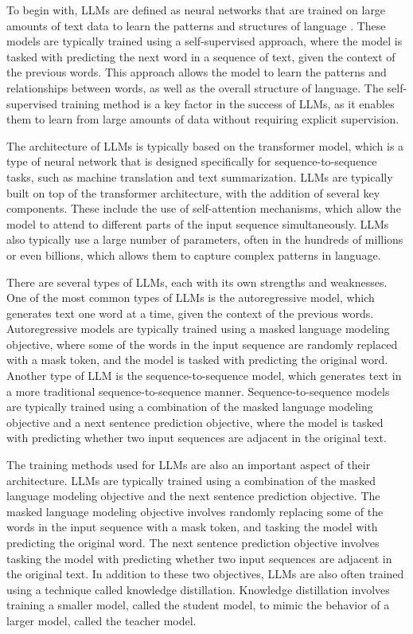 \documentclass[11pt]{article}
\begin{document}
To begin with, LLMs are defined as neural networks that are trained on large amounts of text data to learn the patterns and structures of language \cite{ref1}. These models are typically trained using a self-supervised approach, where the model is tasked with predicting the next word in a sequence of text, given the context of the previous words. This approach allows the model to learn the patterns and relationships between words, as well as the overall structure of language. The self-supervised training method is a key factor in the success of LLMs, as it enables them to learn from large amounts of data without requiring explicit supervision.

The architecture of LLMs is typically based on the transformer model, which is a type of neural network that is designed specifically for sequence-to-sequence tasks, such as machine translation and text summarization. LLMs are typically built on top of the transformer architecture, with the addition of several key components. These include the use of self-attention mechanisms, which allow the model to attend to different parts of the input sequence simultaneously. LLMs also typically use a large number of parameters, often in the hundreds of millions or even billions, which allows them to capture complex patterns in language.

There are several types of LLMs, each with its own strengths and weaknesses. One of the most common types of LLMs is the autoregressive model, which generates text one word at a time, given the context of the previous words. Autoregressive models are typically trained using a masked language modeling objective, where some of the words in the input sequence are randomly replaced with a mask token, and the model is tasked with predicting the original word. Another type of LLM is the sequence-to-sequence model, which generates text in a more traditional sequence-to-sequence manner. Sequence-to-sequence models are typically trained using a combination of the masked language modeling objective and a next sentence prediction objective, where the model is tasked with predicting whether two input sequences are adjacent in the original text.

The training methods used for LLMs are also an important aspect of their architecture. LLMs are typically trained using a combination of the masked language modeling objective and the next sentence prediction objective. The masked language modeling objective involves randomly replacing some of the words in the input sequence with a mask token, and tasking the model with predicting the original word. The next sentence prediction objective involves tasking the model with predicting whether two input sequences are adjacent in the original text. In addition to these two objectives, LLMs are also often trained using a technique called knowledge distillation. Knowledge distillation involves training a smaller model, called the student model, to mimic the behavior of a larger model, called the teacher model.
\end{document}
